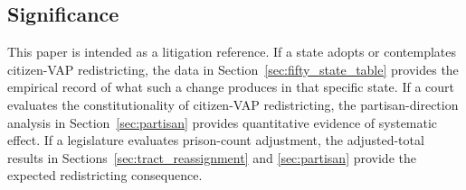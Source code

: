 \subsection{Significance}

This paper is intended as a litigation reference. If a state adopts or contemplates citizen-VAP redistricting, the data in Section~\ref{sec:fifty_state_table} provides the empirical record of what such a change produces in that specific state. If a court evaluates the constitutionality of citizen-VAP redistricting, the partisan-direction analysis in Section~\ref{sec:partisan} provides quantitative evidence of systematic effect. If a legislature evaluates prison-count adjustment, the adjusted-total results in Sections~\ref{sec:tract_reassignment} and \ref{sec:partisan} provide the expected redistricting consequence.
